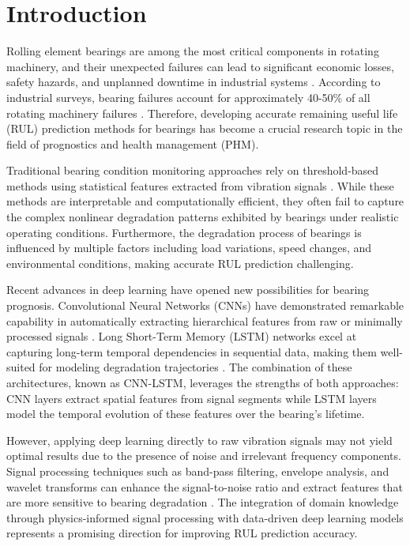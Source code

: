 \documentclass[conference,twocolumn]{IEEEtran}
\begin{document}
\section{Introduction}

Rolling element bearings are among the most critical components in rotating machinery, and their unexpected failures can lead to significant economic losses, safety hazards, and unplanned downtime in industrial systems \cite{lei2018machinery}. According to industrial surveys, bearing failures account for approximately 40-50\% of all rotating machinery failures \cite{randall2011rolling}. Therefore, developing accurate remaining useful life (RUL) prediction methods for bearings has become a crucial research topic in the field of prognostics and health management (PHM).

Traditional bearing condition monitoring approaches rely on threshold-based methods using statistical features extracted from vibration signals \cite{jardine2006review}. While these methods are interpretable and computationally efficient, they often fail to capture the complex nonlinear degradation patterns exhibited by bearings under realistic operating conditions. Furthermore, the degradation process of bearings is influenced by multiple factors including load variations, speed changes, and environmental conditions, making accurate RUL prediction challenging.

Recent advances in deep learning have opened new possibilities for bearing prognosis. Convolutional Neural Networks (CNNs) have demonstrated remarkable capability in automatically extracting hierarchical features from raw or minimally processed signals \cite{zhang2017new}. Long Short-Term Memory (LSTM) networks excel at capturing long-term temporal dependencies in sequential data, making them well-suited for modeling degradation trajectories \cite{zhao2017machine}. The combination of these architectures, known as CNN-LSTM, leverages the strengths of both approaches: CNN layers extract spatial features from signal segments while LSTM layers model the temporal evolution of these features over the bearing's lifetime.

However, applying deep learning directly to raw vibration signals may not yield optimal results due to the presence of noise and irrelevant frequency components. Signal processing techniques such as band-pass filtering, envelope analysis, and wavelet transforms can enhance the signal-to-noise ratio and extract features that are more sensitive to bearing degradation \cite{antoni2007fast}. The integration of domain knowledge through physics-informed signal processing with data-driven deep learning models represents a promising direction for improving RUL prediction accuracy.
\end{document}
